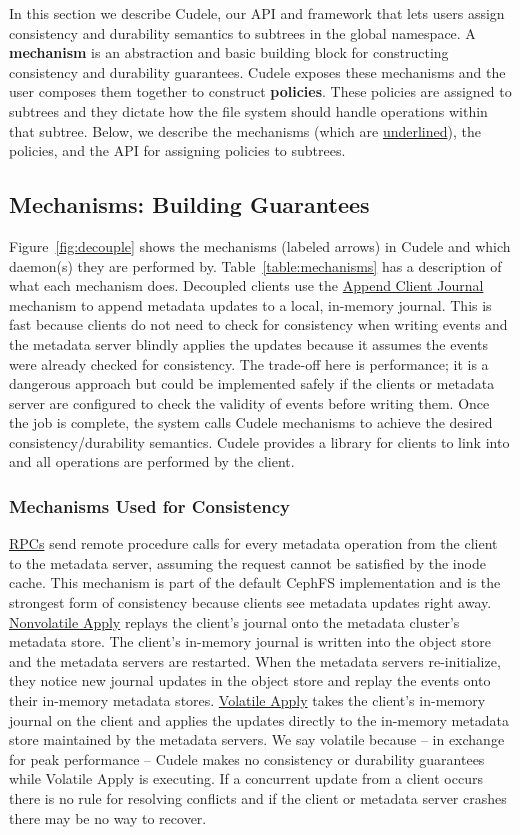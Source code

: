 In this section we describe Cudele, our API and framework that lets users
assign consistency and durability semantics to subtrees in the global
namespace. A \textbf{mechanism} is an abstraction and basic building block for
constructing consistency and durability guarantees. Cudele exposes these
mechanisms and the user composes them together to construct \textbf{policies}.
These policies are assigned to subtrees and they dictate how the file system
should handle operations within that subtree.  Below, we describe the
mechanisms (which are \underline{underlined}), the policies, and the API for assigning
policies to subtrees.

\subsection{Mechanisms: Building Guarantees}
\label{sec:the-cudelesfs-mechanisms}

Figure~\ref{fig:decouple} shows the mechanisms (labeled arrows) in Cudele and
which daemon(s) they are performed by.  Table~\ref{table:mechanisms} has a
description of what each mechanism does.  Decoupled clients use the
\underline{Append Client Journal} mechanism to append metadata updates to a
local, in-memory journal. This is fast because clients do not need to check for
consistency when writing events and the metadata server blindly applies the
updates because it assumes the events were already checked for consistency. The
trade-off here is performance; it is a dangerous approach but could be
implemented safely if the clients or metadata server are configured to check
the validity of events before writing them.  Once the job is complete, the
system calls Cudele mechanisms to achieve the desired consistency/durability
semantics.  Cudele provides a library for clients to link into and all
operations are performed by the client.  

\subsubsection{Mechanisms Used for Consistency} \underline{RPCs} send remote procedure
calls for every metadata operation from the client to the metadata server,
assuming the request cannot be satisfied by the inode cache. This mechanism is
part of the default CephFS implementation and is the strongest form of
consistency because clients see metadata updates right away.  \underline{Nonvolatile
Apply} replays the client's journal onto the metadata cluster's metadata store.
The client's in-memory journal is written into the object store and the
metadata servers are restarted. When the metadata servers re-initialize, they
notice new journal updates in the object store and replay the events onto their
in-memory metadata stores.  \underline{Volatile Apply} takes the client's in-memory journal on the
client and applies the updates directly to the in-memory metadata store maintained
by the metadata servers. We say volatile because -- in exchange for peak
performance -- Cudele makes no consistency or durability guarantees while
Volatile Apply is executing.  If a concurrent update from a client occurs
there is no rule for resolving conflicts and if the client or metadata server
crashes there may be no way to recover.


